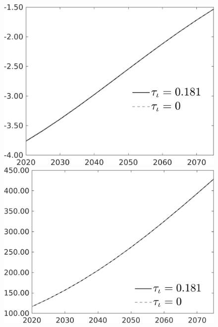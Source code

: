 \documentclass[12pt]{article}
\begin{document}
\begin{figure}[h!!]
\begin{minipage}[]{0.32\textwidth}
\end{minipage}		\begin{minipage}[]{0.32\textwidth}
\includegraphics[width=1\textwidth]{../../codding_model/own_basedOnFried/optimalPol_010922_revision/figures/all_13Sept22/PerdifNoTauf_Equlab_regime0_CompTaul_pf_spillover0_nsk0_xgr1_knspil1_sep1_LFlimit0_emsbase0_countec0_GovRev0_etaa0.79_lgd1.png}
\end{minipage}		\begin{minipage}[]{0.32\textwidth}
\includegraphics[width=1\textwidth]{../../codding_model/own_basedOnFried/optimalPol_010922_revision/figures/all_13Sept22/PerdifNoTauf_Equlab_regime0_CompTaul_pee_spillover0_nsk0_xgr1_knspil1_sep1_LFlimit0_emsbase0_countec0_GovRev0_etaa0.79_lgd1.png}

\end{minipage}
\end{figure}
\end{document}
